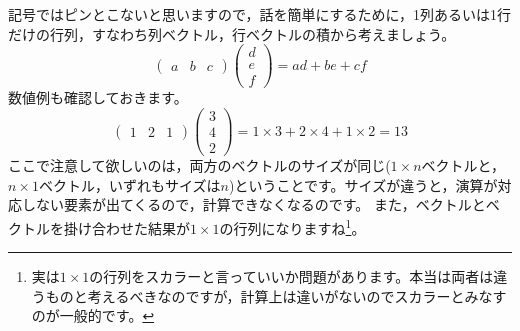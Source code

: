 \documentclass{ltjsbook}
\begin{document}
記号ではピンとこないと思いますので，話を簡単にするために，1列あるいは1行だけの行列，すなわち列ベクトル，行ベクトルの積から考えましょう。
\[
	\begin{pmatrix} a & b & c \end{pmatrix}\begin{pmatrix} d\\e\\f \end{pmatrix} = ad + be + cf
\]
数値例も確認しておきます。
\[
	\begin{pmatrix}
		1 & 2 & 1
	\end{pmatrix}
	\begin{pmatrix}
		3 \\4\\2
	\end{pmatrix}
	=1\times 3 + 2 \times 4 + 1 \times 2 = 13
\]
ここで注意して欲しいのは，両方のベクトルのサイズが同じ($1\times n$ベクトルと，$n \times 1$ベクトル，いずれもサイズは$n$)ということです。サイズが違うと，演算が対応しない要素が出てくるので，計算できなくなるのです。
また，ベクトルとベクトルを掛け合わせた結果が$1 \times 1$の行列になりますね\footnote{実は$1\times 1$の行列をスカラーと言っていいか問題があります。本当は両者は違うものと考えるべきなのですが，計算上は違いがないのでスカラーとみなすのが一般的です。}。
\end{document}
